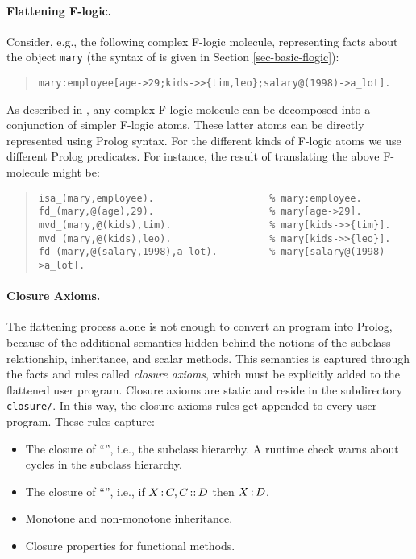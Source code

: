 \documentclass[11pt]{report}
\begin{document}
\paragraph{Flattening F-logic.}

Consider, e.g., the following complex F-logic molecule, representing
facts about the object \texttt{mary} (the syntax of \fl is given in
Section \ref{sec-basic-flogic}):

\begin{quote}
{\small\begin{verbatim}
mary:employee[age->29;kids->>{tim,leo};salary@(1998)->a_lot].
\end{verbatim}}
\end{quote}

As described in \cite{KLW95}, any complex F-logic molecule can be
decomposed into a conjunction of simpler F-logic atoms. These latter atoms
can be directly represented using Prolog syntax.  For the different kinds
of F-logic atoms we use different Prolog predicates. For instance, the
result of translating the above F-molecule might be:

\begin{quote}
{\small \begin{verbatim}
isa_(mary,employee).                    % mary:employee.
fd_(mary,@(age),29).                    % mary[age->29].
mvd_(mary,@(kids),tim).                 % mary[kids->>{tim}].
mvd_(mary,@(kids),leo).                 % mary[kids->>{leo}].
fd_(mary,@(salary,1998),a_lot).         % mary[salary@(1998)->a_lot].
\end{verbatim}}
\end{quote}



\paragraph{Closure Axioms.}

The flattening process alone is not enough to convert an \fl program
into Prolog, because of the additional semantics hidden behind the notions of
the subclass relationship, inheritance, and scalar methods. This semantics
is captured through the facts and rules called \emph{closure axioms}, which
must be explicitly added to the flattened user program.  Closure axioms are
static and reside in the subdirectory \texttt{closure/}. In this way, the
closure axioms rules get appended to every user program. These rules capture:

\begin{itemize}
\item The closure of ``\subcl'', i.e., the subclass hierarchy.  A
  runtime check warns about cycles in the subclass hierarchy.
\item The closure of ``\isa'', i.e., if $X\,{\bf{:}}\, C, C\,{\bf{::}}\, D$ then
  $X\,{\bf{:}}\, D$. 
\item Monotone and non-monotone inheritance.
\item Closure properties for functional methods.
\end{itemize}
\end{document}

